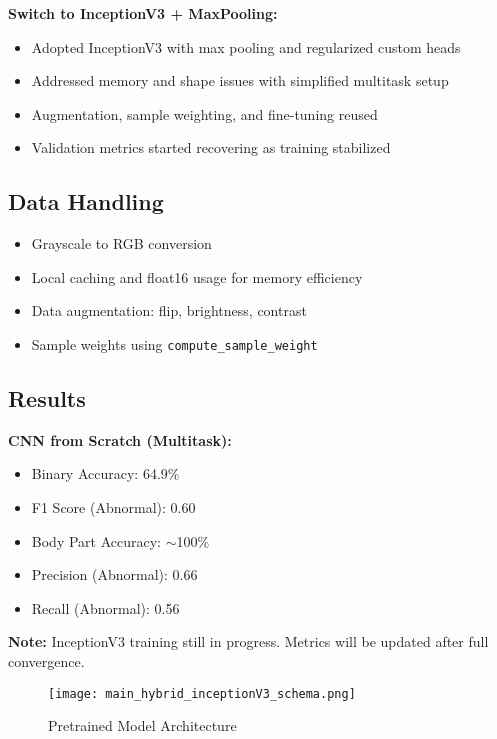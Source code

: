 \documentclass[11pt]{article}
\begin{document}
\textbf{Switch to InceptionV3 + MaxPooling:}
\begin{itemize}
    \item Adopted InceptionV3 with max pooling and regularized custom heads
    \item Addressed memory and shape issues with simplified multitask setup
    \item Augmentation, sample weighting, and fine-tuning reused
    \item Validation metrics started recovering as training stabilized
\end{itemize}

\subsection*{Data Handling}
\begin{itemize}
    \item Grayscale to RGB conversion
    \item Local caching and float16 usage for memory efficiency
    \item Data augmentation: flip, brightness, contrast
    \item Sample weights using \texttt{compute\_sample\_weight}
\end{itemize}

\subsection*{Results}

\textbf{CNN from Scratch (Multitask):}
\begin{itemize}
    \item Binary Accuracy: 64.9\%
    \item F1 Score (Abnormal): 0.60
    \item Body Part Accuracy: $\sim$100\%
    \item Precision (Abnormal): 0.66
    \item Recall (Abnormal): 0.56
\end{itemize}

\vspace{1em}
\noindent\textbf{Note:} InceptionV3 training still in progress. Metrics will be updated after full convergence.

\begin{figure}
    \centering
    \texttt{[image: main\_hybrid\_inceptionV3\_schema.png]}
    \caption{Pretrained Model Architecture}
    \label{fig:enter-label}
\end{figure}
\end{document}

